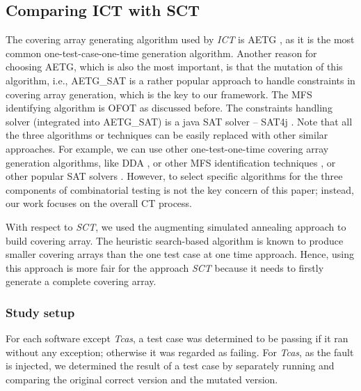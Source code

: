 \documentclass[10pt,journal,compsoc]{IEEEtran}
\begin{document}
\subsection{Comparing ICT with SCT}\label{sec:emprical:CompareSCT}
The covering array generating algorithm used by \emph{ICT} is AETG \cite{cohen1997aetg}, as it is the most common one-test-case-one-time generation algorithm. Another reason for choosing AETG, which is also the most important, is that the mutation of this algorithm, i.e., AETG\_SAT \cite{cohen2007exploiting,cohen2008constructing} is a rather popular approach to handle constraints in covering array generation, which is the key to our framework. The MFS identifying algorithm is OFOT \cite{nie2011minimal} as discussed before. The constraints handling solver (integrated into AETG\_SAT) is a java SAT solver -- SAT4j \cite{le2010sat4j}.  Note that all the three algorithms or techniques can be easily replaced with other similar approaches. For example, we can use other one-test-one-time covering array generation algorithms, like DDA \cite{bryce2007density}, or other MFS identification techniques \cite{zhang2011characterizing,niu2013identifying}, or other popular SAT solvers \cite{een2004extensible}. However, to select specific algorithms for the three components of combinatorial testing is not the key concern of this paper; instead, our work focuses on the overall CT process.

With respect to \emph{SCT}, we used the augmenting simulated annealing approach \cite{cohen2003augmenting,cohen2008constructing2} to build covering array. The heuristic search-based algorithm is known to produce smaller covering arrays than the one test case at one time approach. Hence, using this approach is more fair for the approach \emph{SCT} because it needs to firstly generate a complete covering array.


\subsubsection{Study setup}
For each software except \emph{Tcas}, a test case was determined to be passing if it ran without any exception; otherwise it was regarded as failing. For \emph{Tcas}, as the fault is injected, we determined the result of a test case by separately running and comparing the original correct version and the mutated version.
\end{document}
